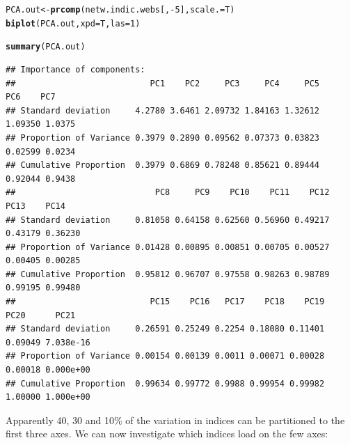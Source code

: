 \documentclass[a4paper, 11pt]{article}\usepackage[]{graphicx}\usepackage[]{color}
\makeatletter
\newcommand{\hlnum}[1]{\textcolor[rgb]{0.686,0.059,0.569}{#1}}%
\newcommand{\hlopt}[1]{\textcolor[rgb]{0,0,0}{#1}}%
\newcommand{\hlstd}[1]{\textcolor[rgb]{0.345,0.345,0.345}{#1}}%
\newcommand{\hlkwb}[1]{\textcolor[rgb]{0.69,0.353,0.396}{#1}}%
\newcommand{\hlkwc}[1]{\textcolor[rgb]{0.333,0.667,0.333}{#1}}%
\newcommand{\hlkwd}[1]{\textcolor[rgb]{0.737,0.353,0.396}{\textbf{#1}}}%
\newenvironment{kframe}{%
 \def\at@end@of@kframe{}%
 \ifinner\ifhmode%
  \def\at@end@of@kframe{\end{minipage}}%
  \begin{minipage}{\columnwidth}%
 \fi\fi%
 \def\FrameCommand##1{\hskip\@totalleftmargin \hskip-\fboxsep
 \colorbox{shadecolor}{##1}\hskip-\fboxsep
     \hskip-\linewidth \hskip-\@totalleftmargin \hskip\columnwidth}%
 \MakeFramed {\advance\hsize-\width
   \@totalleftmargin\z@ \linewidth\hsize
   \@setminipage}}%
 {\par\unskip\endMakeFramed%
 \at@end@of@kframe}
\newenvironment{knitrout}{}{} %
\makeatother
\begin{document}
\begin{knitrout}
\color{fgcolor}\begin{kframe}
\begin{alltt}
\hlstd{PCA.out} \hlkwb{<-} \hlkwd{prcomp}\hlstd{(netw.indic.webs[,}\hlopt{-}\hlnum{5}\hlstd{],} \hlkwc{scale.}\hlstd{=T)}
\hlkwd{biplot}\hlstd{(PCA.out,} \hlkwc{xpd}\hlstd{=T,} \hlkwc{las}\hlstd{=}\hlnum{1}\hlstd{)}
\end{alltt}
\end{kframe}
\end{knitrout}
\begin{knitrout}
\color{fgcolor}\begin{kframe}
\begin{alltt}
\hlkwd{summary}\hlstd{(PCA.out)}
\end{alltt}
\begin{verbatim}
## Importance of components:
##                           PC1    PC2     PC3     PC4     PC5     PC6    PC7
## Standard deviation     4.2780 3.6461 2.09732 1.84163 1.32612 1.09350 1.0375
## Proportion of Variance 0.3979 0.2890 0.09562 0.07373 0.03823 0.02599 0.0234
## Cumulative Proportion  0.3979 0.6869 0.78248 0.85621 0.89444 0.92044 0.9438
##                            PC8     PC9    PC10    PC11    PC12    PC13    PC14
## Standard deviation     0.81058 0.64158 0.62560 0.56960 0.49217 0.43179 0.36230
## Proportion of Variance 0.01428 0.00895 0.00851 0.00705 0.00527 0.00405 0.00285
## Cumulative Proportion  0.95812 0.96707 0.97558 0.98263 0.98789 0.99195 0.99480
##                           PC15    PC16   PC17    PC18    PC19    PC20      PC21
## Standard deviation     0.26591 0.25249 0.2254 0.18080 0.11401 0.09049 7.038e-16
## Proportion of Variance 0.00154 0.00139 0.0011 0.00071 0.00028 0.00018 0.000e+00
## Cumulative Proportion  0.99634 0.99772 0.9988 0.99954 0.99982 1.00000 1.000e+00
\end{verbatim}
\end{kframe}
\end{knitrout}

Apparently 40, 30 and 10\% of the variation in indices can be partitioned to the first three axes. We can now investigate which indices load on the few axes:
\end{document}

